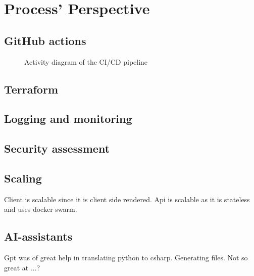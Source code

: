 \section{Process' Perspective}
\label{ch:background} 

\subsection{GitHub actions}
\begin{figure}
      \centering
      
      \caption{Activity diagram of the CI/CD pipeline}
      \label{fig:activity_diagram}
\end{figure}

\subsection{Terraform}


\subsection{Logging and monitoring}

\subsection{Security assessment}

\subsection{Scaling}

Client is scalable since it is client side rendered.
Api is scalable as it is stateless and uses docker swarm.

\subsection{AI-assistants}

Gpt was of great help in translating python to csharp.
Generating files.
Not so great at ...?